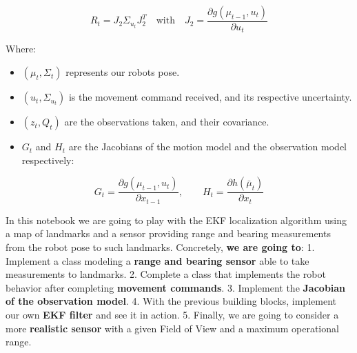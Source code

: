 \documentclass[11pt]{article}
\providecommand{\tightlist}{%
      \setlength{\itemsep}{0pt}\setlength{\parskip}{0pt}}
\begin{document}
\[R_t = J_2 \Sigma_{u_t} J_2^T \quad\text{with}\quad J_2 = \frac{\partial g(\mu_{t-1}, u_t)}{\partial u_t}\]

Where:

\begin{itemize}
\tightlist
\item
  \((\mu_t, \Sigma_t)\) represents our robots pose.
\item
  \((u_t, \Sigma_{u_t})\) is the movement command received, and its
  respective uncertainty.
\item
  \((z_t, Q_t)\) are the observations taken, and their covariance.
\item
  \(G_t\) and \(H_t\) are the Jacobians of the motion model and the
  observation model respectively:
\end{itemize}

\[G_t = \frac{\partial g(\mu_{t-1}, u_t)}{\partial x_{t-1}}, \qquad H_t = \frac{\partial h(\bar\mu_t)}{\partial x_t}\]

    In this notebook we are going to play with the EKF localization
algorithm using a map of landmarks and a sensor providing range and
bearing measurements from the robot pose to such landmarks. Concretely,
\textbf{we are going to}: 1. Implement a class modeling a \textbf{range
and bearing sensor} able to take measurements to landmarks. 2. Complete
a class that implements the robot behavior after completing
\textbf{movement commands}. 3. Implement the \textbf{Jacobian of the
observation model}. 4. With the previous building blocks, implement our
own \textbf{EKF filter} and see it in action. 5. Finally, we are going
to consider a more \textbf{realistic sensor} with a given Field of View
and a maximum operational range.
\end{document}
